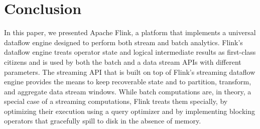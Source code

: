 \documentclass[11pt]{article}
\begin{document}
\vspace{-5mm}
\section{Conclusion}
\vspace{-2mm}
\label{sec:conclusions}
In this paper, we presented Apache Flink, a platform that implements a universal dataflow engine designed to perform both stream and batch analytics. Flink's dataflow engine treats operator state and logical intermediate results as first-class citizens and is used by both the batch and a data stream APIs with different parameters. The streaming API that is built on top of  Flink's streaming dataflow engine provides the means to keep recoverable state and to partition, transform, and aggregate data stream windows. While batch computations are, in theory, a special case of a streaming computations, Flink treats them specially, by optimizing their execution using a query optimizer and by implementing blocking operators that gracefully spill to disk in the absence of memory. 

\end{document}
